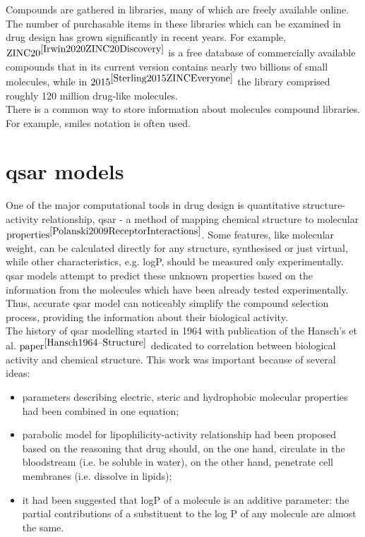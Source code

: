 Compounds are gathered in libraries, many of which are freely available online.
The number of purchasable items in these libraries which can be examined in drug design has grown significantly in recent years.
For example, $\text{ZINC20}^{\cite{Irwin2020ZINC20Discovery}}$ is a free database of commercially available compounds that in its current version contains nearly two billions of small molecules, while in $\text{2015}^{\cite{Sterling2015ZINCEveryone}}$ the library comprised roughly 120 million drug-like molecules.
\hfill\break\\
There is a common way to store information about molecules compound libraries.
For example, \acrshort{smiles} notation is often used.\\

\section{\acrshort{qsar} models}
One of the major computational tools in drug design is quantitative structure-activity relationship, \acrshort{qsar} - a method of mapping chemical structure to molecular $\text{properties}^{\cite{Polanski2009ReceptorInteractions}}$. 
Some features, like molecular weight, can be calculated directly for any structure, synthesised or just virtual, while other characteristics, e.g. logP, should be measured only experimentally.
\acrshort{qsar} models attempt to predict these unknown properties based on the information from the molecules which have been already tested experimentally.
Thus, accurate \acrshort{qsar} model can noticeably simplify the compound selection process, providing the information about their biological activity.\\

The history of \acrshort{qsar} modelling started in 1964 with publication of the Hansch's et al. $\text{paper}^{\cite{Hansch1964--Structure}}$ dedicated to correlation between biological activity and chemical structure.
This work was important because of several ideas:
\begin{itemize}

    \item  parameters describing electric, steric and hydrophobic molecular properties had been combined in one equation;
    \item parabolic model for lipophilicity-activity relationship had been proposed based on the reasoning that drug should, on the one hand, circulate in the bloodstream (i.e. be soluble in water), on the other hand, penetrate cell membranes (i.e. dissolve in lipids); 
    \item it had been suggested that logP of a molecule is an additive parameter: the partial contributions of a substituent to the log P of any molecule are almost the same.
\end{itemize}

